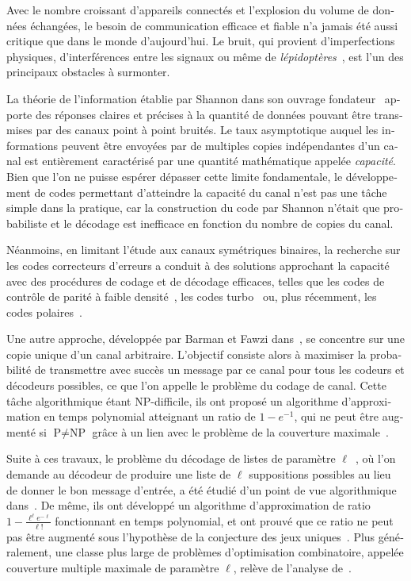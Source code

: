 \begin{otherlanguage}{french}
Avec le nombre croissant d'appareils connectés et l'explosion du volume de données échangées, le besoin de communication efficace et fiable n'a jamais été aussi critique que dans le monde d'aujourd'hui. Le bruit, qui provient d'imperfections physiques, d'interférences entre les signaux ou même de \emph{lépidoptères}~\cite{Hopper81}, est l'un des principaux obstacles à surmonter.

La théorie de l'information établie par Shannon dans son ouvrage fondateur~\cite{Shannon48} apporte des réponses claires et précises à la quantité de données pouvant être transmises par des canaux point à point bruités. Le taux asymptotique auquel les informations peuvent être envoyées par de multiples copies indépendantes d'un canal est entièrement caractérisé par une quantité mathématique appelée \emph{capacité}. Bien que l'on ne puisse espérer dépasser cette limite fondamentale, le développement de codes permettant d'atteindre la capacité du canal n'est pas une tâche simple dans la pratique, car la construction du code par Shannon n'était que probabiliste et le décodage est inefficace en fonction du nombre de copies du canal.

Néanmoins, en limitant l'étude aux canaux symétriques binaires, la recherche sur les codes correcteurs d'erreurs a conduit à des solutions approchant la capacité avec des procédures de codage et de décodage efficaces, telles que les codes de contrôle de parité à faible densité~\cite{Gallager62}, les codes turbo~\cite{BG96} ou, plus récemment, les codes polaires~\cite{Arikan09}.

Une autre approche, développée par Barman et Fawzi dans~\cite{BF18}, se concentre sur une copie unique d'un canal arbitraire. L'objectif consiste alors à maximiser la probabilité de transmettre avec succès un message par ce canal pour tous les codeurs et décodeurs possibles, ce que l'on appelle le problème du codage de canal. Cette tâche algorithmique étant \textrm{NP}-difficile, ils ont proposé un algorithme d'approximation en temps polynomial atteignant un ratio de $1-e^{-1}$, qui ne peut être augmenté si $\textrm{P}\not=\textrm{NP}$ grâce à un lien avec le problème de la couverture maximale~\cite{Feige98}.

Suite à ces travaux, le problème du décodage de listes de paramètre $\ell$~\cite{Elias57,Wozencraft58}, où l'on demande au décodeur de produire une liste de $\ell$ suppositions possibles au lieu de donner le bon message d'entrée, a été étudié d'un point de vue algorithmique dans~\cite{BFGG20}. De même, ils ont développé un algorithme d'approximation de ratio $1-\frac{\ell^{\ell}e^{-\ell}}{\ell!}$ fonctionnant en temps polynomial, et ont prouvé que ce ratio ne peut pas être augmenté sous l'hypothèse de la conjecture des jeux uniques~\cite{Khot02}. Plus généralement, une classe plus large de problèmes d'optimisation combinatoire, appelée couverture multiple maximale de paramètre $\ell$, relève de l'analyse de~\cite{BFGG20}.


\end{otherlanguage}
